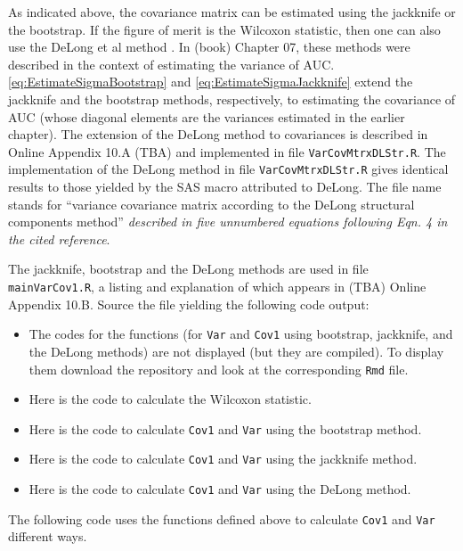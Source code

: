 \documentclass[
]{book}
\begin{document}
As indicated above, the covariance matrix can be estimated using the jackknife or the bootstrap. If the figure of merit is the Wilcoxon statistic, then one can also use the DeLong et al method \citep{RN112}. In (book) Chapter 07, these methods were described in the context of estimating the variance of AUC. \eqref{eq:EstimateSigmaBootstrap} and \eqref{eq:EstimateSigmaJackknife} extend the jackknife and the bootstrap methods, respectively, to estimating the covariance of AUC (whose diagonal elements are the variances estimated in the earlier chapter). The extension of the DeLong method to covariances is described in Online Appendix 10.A (TBA) and implemented in file \texttt{VarCovMtrxDLStr.R}. The implementation of the DeLong method \citep{RN112} in file \texttt{VarCovMtrxDLStr.R} gives identical results to those yielded by the SAS macro attributed to DeLong. The file name stands for ``variance covariance matrix according to the DeLong structural components method'' \emph{described in five unnumbered equations following Eqn. 4 in the cited reference}.

The jackknife, bootstrap and the DeLong methods are used in file \texttt{mainVarCov1.R}, a listing and explanation of which appears in (TBA) Online Appendix 10.B. Source the file yielding the following code output:

\begin{itemize}
\item
  The codes for the functions (for \texttt{Var} and \texttt{Cov1} using bootstrap, jackknife, and the DeLong methods) are not displayed (but they are compiled). To display them download the repository and look at the corresponding \texttt{Rmd} file.
\item
  Here is the code to calculate the Wilcoxon statistic.
\item
  Here is the code to calculate \texttt{Cov1} and \texttt{Var} using the bootstrap method.
\item
  Here is the code to calculate \texttt{Cov1} and \texttt{Var} using the jackknife method.
\item
  Here is the code to calculate \texttt{Cov1} and \texttt{Var} using the DeLong method.
\end{itemize}

The following code uses the functions defined above to calculate \texttt{Cov1} and \texttt{Var} different ways.
\end{document}

